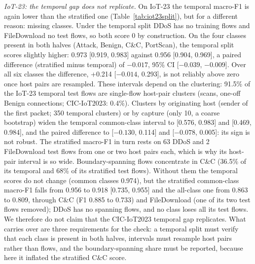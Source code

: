 \emph{IoT-23: the temporal gap does not replicate.} On IoT-23 the temporal macro-F1 is again lower than the stratified one (Table~\ref{tab:iot23split}), but for a different reason: missing classes. Under the temporal split DDoS has no training flows and FileDownload no test flows, so both score 0 by construction. On the four classes present in both halves (Attack, Benign, C\&C, PortScan), the temporal split scores slightly higher: 0.973 [0.919, 0.983] against 0.956 [0.904, 0.969], a paired difference (stratified minus temporal) of $-0.017$, 95\% CI [$-0.039$, $-0.009$]. Over all six classes the difference, +0.214 [$-0.014$, 0.293], is not reliably above zero once host pairs are resampled. These intervals depend on the clustering: 91.5\% of the IoT-23 temporal test flows are single-flow host-pair clusters (scans, one-off Benign connections; CIC-IoT2023: 0.4\%). Clusters by originating host (sender of the first packet; 350 temporal clusters) or by capture (only 10, a coarse bootstrap) widen the temporal common-class interval to [0.576, 0.983] and [0.469, 0.984], and the paired difference to [$-0.130$, 0.114] and [$-0.078$, 0.005]: its sign is not robust. The stratified macro-F1 in turn rests on 63 DDoS and 2 FileDownload test flows from one or two host pairs each, which is why its host-pair interval is so wide. Boundary-spanning flows concentrate in C\&C (36.5\% of its temporal and 68\% of its stratified test flows). Without them the temporal scores do not change (common classes 0.974), but the stratified common-class macro-F1 falls from 0.956 to 0.918 [0.735, 0.955] and the all-class one from 0.863 to 0.809, through C\&C (F1 0.885 to 0.733) and FileDownload (one of its two test flows removed); DDoS has no spanning flows, and no class loses all its test flows. We therefore do not claim that the CIC-IoT2023 temporal gap replicates. What carries over are three requirements for the check: a temporal split must verify that each class is present in both halves, intervals must resample host pairs rather than flows, and the boundary-spanning share must be reported, because here it inflated the stratified C\&C score.
